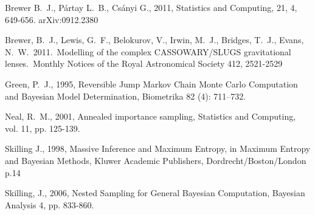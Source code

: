 \documentclass[letterpaper, 11pt]{article}
\begin{document}
\begin{thebibliography}{}
 Brewer B.~J., P{\'a}rtay L.~B., Cs{\'a}nyi G., 2011,
Statistics and Computing, 21, 4, 649-656. arXiv:0912.2380

 Brewer, B.~J., Lewis,
G.~F., Belokurov, V., Irwin, M.~J., Bridges, T.~J., Evans, N.~W.\ 2011.\
Modelling of the complex CASSOWARY/SLUGS gravitational lenses.\ Monthly
Notices of the Royal Astronomical Society 412, 2521-2529

Green, P.~J., 1995, Reversible Jump Markov Chain Monte Carlo Computation and Bayesian Model Determination, Biometrika 82 (4): 711–732.

 Neal, R.~M., 2001, 
Annealed importance sampling, Statistics and Computing, vol. 11, pp. 125-139.

Skilling J., 1998, Massive Inference and Maximum Entropy, in Maximum Entropy
and Bayesian Methods, Kluwer Academic Publishers, Dordrecht/Boston/London p.14

 Skilling, J., 2006, Nested Sampling for General Bayesian Computation, Bayesian Analysis 4, pp. 833-860.


\end{thebibliography}
\end{document}
